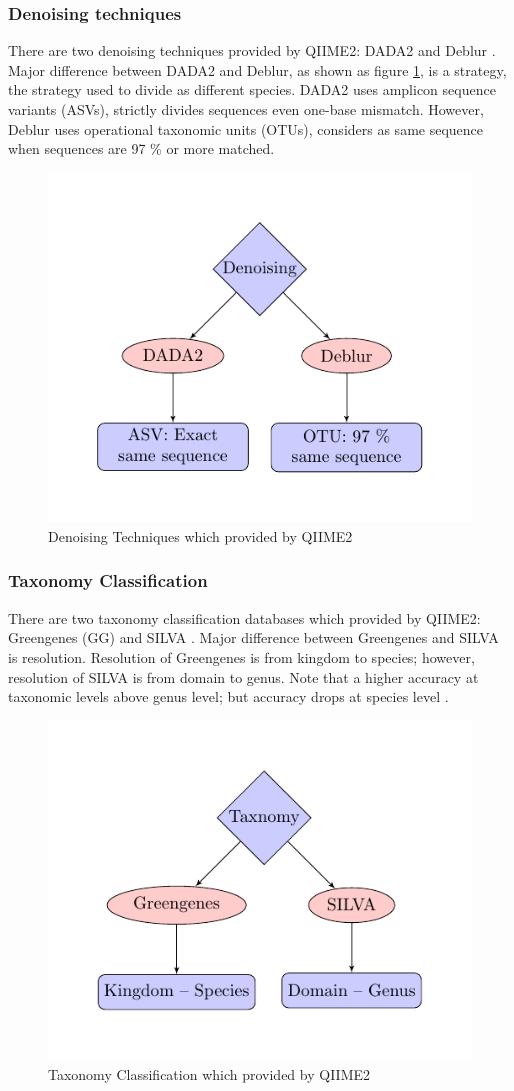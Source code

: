 \documentclass[a4paper]{article}
\begin{document}
            \subsubsection{Denoising techniques}
                There are two denoising techniques provided by QIIME2: DADA2 \cite{DADA1} and Deblur \cite{deblur1}. Major difference between DADA2 and Deblur, as shown as figure \ref{fig:denosing-workflow}, is a strategy, the strategy used to divide as different species. DADA2 uses amplicon sequence variants (ASVs), strictly divides sequences even one-base mismatch. However, Deblur uses operational taxonomic units (OTUs), considers as same sequence when sequences are 97 \% or more matched.

                \begin{figure}[p]
                    \centering
                    \includegraphics[width=0.5 \linewidth]{figures/denoising/denoising.pdf}
                    \caption{Denoising Techniques which provided by QIIME2}
                    \label{fig:denosing-workflow}
                \end{figure}

            \subsubsection{Taxonomy Classification}
                There are two taxonomy classification databases which provided by QIIME2: Greengenes (GG) \cite{greengenes1} and SILVA \cite{silva1}. Major difference between Greengenes and SILVA is resolution. Resolution of Greengenes is from kingdom to species; however, resolution of SILVA is from domain to genus. Note that a higher accuracy at taxonomic levels above genus level; but accuracy drops at species level \cite{performance1}.

                \begin{figure}[p]
                    \centering
                    \includegraphics[width=0.5 \linewidth]{figures/taxonomy/taxonomy.pdf}
                    \caption{Taxonomy Classification which provided by QIIME2}
                    \label{fig:taxonomy-workflow}
                \end{figure}
\end{document}
